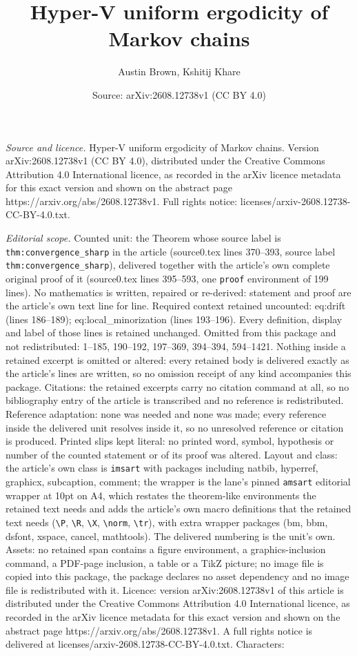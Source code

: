 \documentclass[10pt,a4paper]{amsart}
\title[Hyper-V uniform ergodicity of Markov chains]{Hyper-V uniform ergodicity of Markov chains}
\author{Austin Brown, Kshitij Khare}
\date{Source: arXiv:2608.12738v1 (CC BY 4.0)}
\begin{document}
\maketitle

\noindent\emph{Source and licence.} Hyper-V uniform ergodicity of Markov chains. Version arXiv:2608.12738v1 (CC BY 4.0), distributed under the Creative Commons Attribution 4.0 International licence, as recorded in the arXiv licence metadata for this exact version and shown on the abstract page https://arxiv.org/abs/2608.12738v1. Full rights notice: licenses/arxiv-2608.12738-CC-BY-4.0.txt.\par\smallskip

\noindent\textit{Editorial scope.} Counted unit: the Theorem whose source label is \texttt{thm:convergence\_sharp} in the article (source0.tex lines 370--393, source label \texttt{thm:convergence\_sharp}), delivered together with the article's own complete original proof of it (source0.tex lines 395--593, one \texttt{proof} environment of 199 lines). No mathematics is written, repaired or re-derived: statement and proof are the article's own text line for line. Required context retained uncounted: eq:drift (lines 186--189); eq:local\_minorization (lines 193--196). Every definition, display and label of those lines is retained unchanged. Omitted from this package and not redistributed: 1--185, 190--192, 197--369, 394--394, 594--1421. Nothing inside a retained excerpt is omitted or altered: every retained body is delivered exactly as the article's lines are written, so no omission receipt of any kind accompanies this package. Citations: the retained excerpts carry no citation command at all, so no bibliography entry of the article is transcribed and no reference is redistributed. Reference adaptation: none was needed and none was made; every reference inside the delivered unit resolves inside it, so no unresolved reference or citation is produced. Printed slips kept literal: no printed word, symbol, hypothesis or number of the counted statement or of its proof was altered. Layout and class: the article's own class is \texttt{imsart} with packages including natbib, hyperref, graphicx, subcaption, comment; the wrapper is the lane's pinned \texttt{amsart} editorial wrapper at 10pt on A4, which restates the theorem-like environments the retained text needs and adds the article's own macro definitions that the retained text needs (\texttt{\textbackslash P}, \texttt{\textbackslash R}, \texttt{\textbackslash X}, \texttt{\textbackslash norm}, \texttt{\textbackslash tr}), with extra wrapper packages (bm, bbm, dsfont, xspace, cancel, mathtools). The delivered numbering is the unit's own. Assets: no retained span contains a figure environment, a graphics-inclusion command, a PDF-page inclusion, a table or a TikZ picture; no image file is copied into this package, the package declares no asset dependency and no image file is redistributed with it. Licence: version arXiv:2608.12738v1 of this article is distributed under the Creative Commons Attribution 4.0 International licence, as recorded in the arXiv licence metadata for this exact version and shown on the abstract page https://arxiv.org/abs/2608.12738v1. A full rights notice is delivered at licenses/arxiv-2608.12738-CC-BY-4.0.txt. Characters: 
\end{document}
